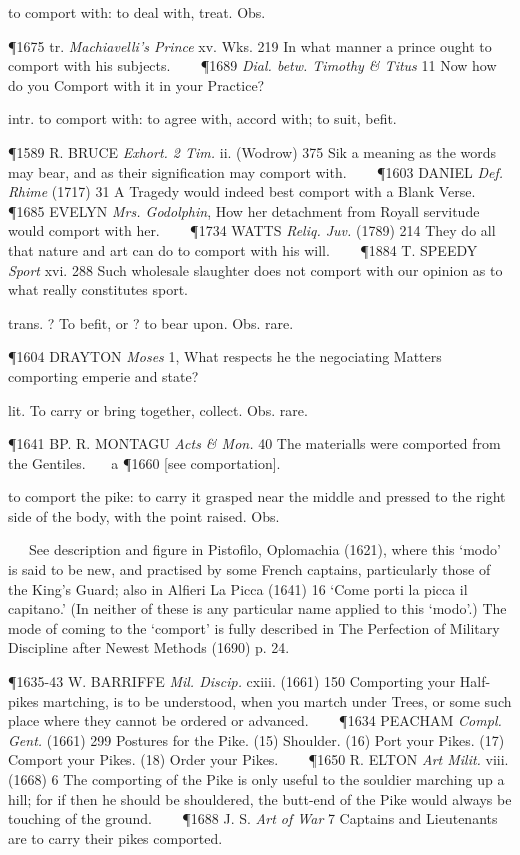 \begin{description}[wide, labelwidth=!, labelindent=0pt]
\begin{myenumerate}
 to comport with: to deal with, treat. Obs.

\P 1675 tr.  \textit{Machiavelli's Prince} xv. Wks. 219 In what manner a prince ought to comport with his subjects.    
\P 1689 \textit{Dial.  betw. Timothy \& Titus} 11 Now how do you Comport with it in your Practice?

 intr. to comport with: to agree with, accord with; to suit, befit.

\P 1589 R. BRUCE  \textit{Exhort. 2 Tim.} ii. (Wodrow) 375 Sik a meaning as the words may bear, and as their signification may comport with.    
\P 1603 DANIEL  \textit{Def. Rhime} (1717) 31 A Tragedy would indeed best comport with a Blank Verse.    
\P 1685 EVELYN  \textit{Mrs. Godolphin}, How her detachment from Royall servitude would comport with her.    
\P 1734 WATTS  \textit{Reliq. Juv.} (1789) 214 They do all that nature and art can do to comport with his will.    
\P 1884 T. SPEEDY  \textit{Sport} xvi. 288 Such wholesale slaughter does not comport with our opinion as to what really constitutes sport.

 trans. ? To befit, or ? to bear upon. Obs. rare.

\P 1604 DRAYTON  \textit{Moses} 1, What respects he the negociating Matters comporting emperie and state?

 lit. To carry or bring together, collect. Obs. rare.

\P 1641 BP. R. MONTAGU  \textit{Acts \& Mon.} 40 The materialls were comported from the Gentiles.    a 
\P 1660 [see comportation].

 to comport the pike: to carry it grasped near the middle and pressed to the right side of the body, with the point raised. Obs.

   See description and figure in Pistofilo, Oplomachia (1621), where this ‘modo’ is said to be new, and practised by some French captains, particularly those of the King's Guard; also in Alfieri La Picca (1641) 16 ‘Come porti la picca il capitano.’ (In neither of these is any particular name applied to this ‘modo’.) The mode of coming to the ‘comport’ is fully described in The Perfection of Military Discipline after Newest Methods (1690) p. 24.

\P 1635-43 W. BARRIFFE  \textit{Mil. Discip.} cxiii. (1661) 150 Comporting your Half-pikes martching, is to be understood, when you martch under Trees, or some such place where they cannot be ordered or advanced.    
\P 1634 PEACHAM  \textit{Compl. Gent.} (1661) 299 Postures for the Pike. (15) Shoulder. (16) Port your Pikes. (17) Comport your Pikes. (18) Order your Pikes.    
\P 1650 R. ELTON  \textit{Art Milit.} viii. (1668) 6 The comporting of the Pike is only useful to the souldier marching up a hill; for if then he should be shouldered, the butt-end of the Pike would always be touching of the ground.    
\P 1688 J. S. \textit{Art  of War} 7 Captains and Lieutenants are to carry their pikes comported.
\end{myenumerate}



\end{description}
